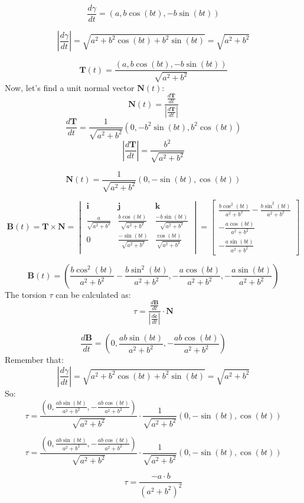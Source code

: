 \documentclass[12pt]{article}
\newcommand{\vect}[1]{\boldsymbol{#1}}
\begin{document}
$$
\frac{d\gamma}{dt}= (a, b \cos(bt), -b \sin(bt))
$$

$$
\left|\frac{d\gamma}{dt}\right|= \sqrt{a^2+b^2 \cos(bt)+b^2 \sin(bt)}=\sqrt{a^2+b^2}
$$

$$
\vect{T}(t)=\frac{(a, b \cos(bt), -b \sin(bt))}{\sqrt{a^2+b^2}}
$$
Now, let's find a unit normal vector $\vect{N}(t)$:
$$
\vect{N}(t)=\frac{\frac{d \vect{T}}{dt}}{\left| \frac{d \vect{T}}{dt}\right|}
$$
$$
\frac{d \vect{T}}{dt}=\frac{1}{\sqrt{a^2+b^2}}\left(0, -b^2\sin(bt), b^2\cos(bt)\right)
$$
$$
\left|\frac{d \vect{T}}{dt} \right|=\frac{b^2}{\sqrt{a^2+b^2}}
$$

$$
\vect{N}(t)=\frac{1}{\sqrt{a^2+b^2}}\left(0, -\sin(bt), \cos(bt)\right)
$$

$$
\vect{B}(t)=\vect{T}\times\vect{N}=
\begin{vmatrix}
	\vect{i} & \vect{j} & \vect{k} \\
	\frac{a}{\sqrt{a^2+b^2}} & \frac{b \cos(bt)}{\sqrt{a^2+b^2}} & \frac{-b \sin(bt)}{\sqrt{a^2+b^2}} \\
	0 & \frac{-\sin(bt)}{\sqrt{a^2+b^2}} & \frac{\cos(bt)}{\sqrt{a^2+b^2}} \\
\end{vmatrix}
=
\begin{bmatrix}
	\frac{b\cos^2(bt)}{a^2+b^2} - \frac{b\sin^2(bt)}{a^2+b^2} \\
	- \frac{a\cos(bt)}{a^2+b^2} \\
	- \frac{a\sin(bt)}{a^2+b^2}
\end{bmatrix}
$$

$$
\vect{B}(t)=
\left( 
	\frac{b\cos^2(bt)}{a^2+b^2} - \frac{b\sin^2(bt)}{a^2+b^2},
	- \frac{a\cos(bt)}{a^2+b^2},
	- \frac{a\sin(bt)}{a^2+b^2} 
\right)
$$
The torsion $\tau$ can be calculated as:
$$
\tau = \frac{\frac{d \vect{B}}{dt}}{\left| \frac{d\vect{c}}{dt} \right|}\cdot \vect{N}
$$

$$
	\frac{d \vect{B}}{dt} = \left( 0, \frac{ab\sin(bt)}{a^2+b^2}, -\frac{ab\cos(bt)}{a^2+b^2}\right)
$$
Remember that:
$$
	\left|\frac{d\gamma}{dt}\right|= \sqrt{a^2+b^2 \cos(bt)+b^2 \sin(bt)}=\sqrt{a^2+b^2}
$$
So:
$$
\tau = \frac{\left( 0, \frac{ab\sin(bt)}{a^2+b^2}, -\frac{ab\cos(bt)}{a^2+b^2}\right)}{\sqrt{a^2+b^2}}\cdot \frac{1}{\sqrt{a^2+b^2}}\left(0, -\sin(bt), \cos(bt)\right)
$$

$$
\tau = \frac{\left( 0, \frac{ab\sin(bt)}{a^2+b^2}, -\frac{ab\cos(bt)}{a^2+b^2}\right)}{\sqrt{a^2+b^2}}\cdot \frac{1}{\sqrt{a^2+b^2}}\left(0, -\sin(bt), \cos(bt)\right)
$$

$$
\tau = \frac{-a\cdot b}{(a^2+b^2)^2}
$$
\end{document}
